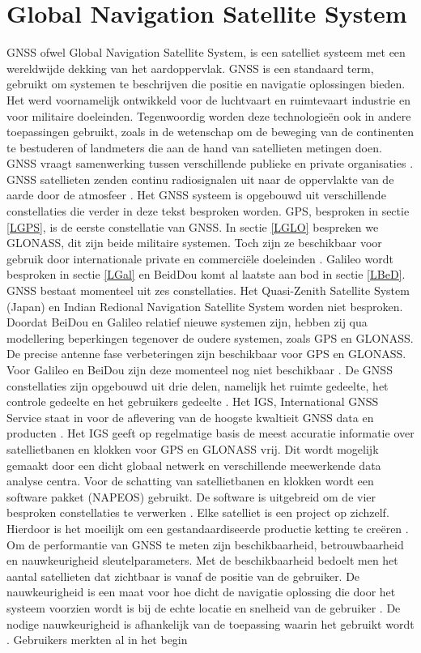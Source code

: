 \section{Global Navigation Satellite System}
\label{LGNS}
GNSS ofwel Global Navigation Satellite System, is een satelliet systeem met een wereldwijde dekking van het aardoppervlak. GNSS is een standaard term, gebruikt om systemen te beschrijven die positie en navigatie oplossingen bieden. Het werd voornamelijk ontwikkeld voor de luchtvaart en ruimtevaart industrie en voor militaire doeleinden. Tegenwoordig worden deze technologie\"en ook in andere toepassingen gebruikt, zoals in de wetenschap om de beweging van de continenten te bestuderen of landmeters die aan de hand van satellieten metingen doen. GNSS vraagt samenwerking tussen verschillende publieke en private organisaties \cite{LBibGNSS3}. GNSS satellieten zenden continu radiosignalen uit naar de oppervlakte van de aarde door de atmosfeer \cite{LBibGPS4}. Het GNSS systeem is opgebouwd uit verschillende constellaties die verder in deze tekst besproken worden. GPS, besproken in sectie \ref{LGPS}, is de eerste constellatie van GNSS. In sectie \ref{LGLO} bespreken we GLONASS, dit zijn beide militaire systemen. Toch zijn ze beschikbaar voor gebruik door internationale private en commerci\"ele doeleinden \cite{LBibGNSS8}. Galileo wordt besproken in sectie \ref{LGal} en BeidDou komt al laatste aan bod in sectie \ref{LBeD}. GNSS bestaat momenteel uit zes constellaties. Het Quasi-Zenith Satellite System (Japan) en Indian Redional Navigation Satellite System worden niet besproken. Doordat BeiDou en Galileo relatief nieuwe systemen zijn, hebben zij qua modellering beperkingen tegenover de oudere systemen, zoals GPS en GLONASS. De precise antenne fase verbeteringen zijn beschikbaar voor GPS en GLONASS. Voor Galileo en BeiDou zijn deze momenteel nog niet beschikbaar \cite{LBibPPP2}. De GNSS constellaties zijn opgebouwd uit drie delen, namelijk het ruimte gedeelte, het controle gedeelte en het gebruikers gedeelte \cite{LBibBeiDou2}.  Het IGS, International GNSS Service staat in voor de aflevering van de hoogste kwaltieit GNSS data en producten \cite{LBibGNSS}. Het IGS geeft op regelmatige basis de meest accuratie informatie over satellietbanen en klokken voor GPS en GLONASS vrij. Dit wordt mogelijk gemaakt door een dicht globaal netwerk en verschillende meewerkende data analyse centra. Voor de schatting van satellietbanen en klokken wordt een software pakket (NAPEOS) gebruikt. De software is uitgebreid om de vier besproken constellaties te verwerken \cite{LBibPPP2}. Elke satelliet is een project op zichzelf. Hierdoor is het moeilijk om een gestandaardiseerde productie ketting te cre\"eren \cite{LBibGNSS3}. Om de performantie van GNSS te meten zijn beschikbaarheid, betrouwbaarheid en nauwkeurigheid sleutelparameters. Met de beschikbaarheid bedoelt men het aantal satellieten dat zichtbaar is vanaf de positie van de gebruiker. De nauwkeurigheid is een maat voor hoe dicht de navigatie oplossing die door het systeem voorzien wordt is bij de echte locatie en snelheid van de gebruiker \cite{LBibGNSS6}. De nodige nauwkeurigheid is afhankelijk van de toepassing waarin het gebruikt wordt \cite{LBibRTK3}. Gebruikers merkten al in het begin 